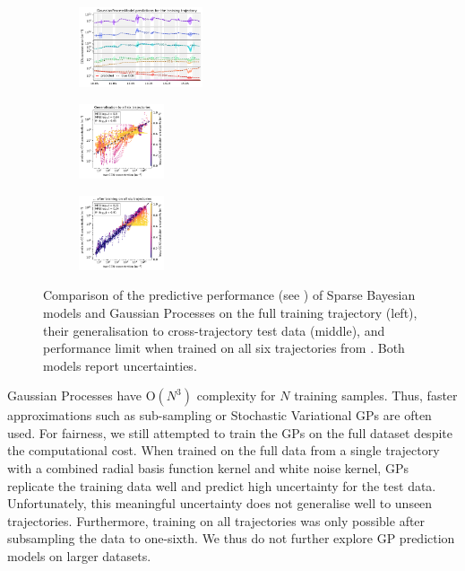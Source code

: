 \begin{figure}[H]
    \begin{subfigure}
    \centering
    \includegraphics[width=0.4\textwidth]{prediction/figures/models/gaussianprocessmodel-training-prediction.pdf}
    \end{subfigure}
    \begin{subfigure}
    \centering
    \includegraphics[width=0.275\textwidth]{prediction/figures/models/gaussianprocessmodel-test-generalisation.pdf}
    \end{subfigure}
    \begin{subfigure}
    \centering
    \includegraphics[width=0.275\textwidth]{prediction/figures/models/gaussianprocessmodel-test-prediction.pdf}
    \end{subfigure}
   
    \vspace{-1em}
    \caption[Predictive Performance of Sparse Bayesian models and Gaussian Processes]{Comparison of the predictive performance (see ) of Sparse Bayesian models and Gaussian Processes on the full training trajectory (left), their generalisation to cross-trajectory test data (middle), and performance limit when trained on all six trajectories from . Both models report uncertainties.}
    \label{fig:bayesian-gp-models}
\end{figure}

\noindent Gaussian Processes have $\text{O}(N^3)$ complexity for $N$ training samples. Thus, faster approximations such as sub-sampling or Stochastic Variational GPs \cite{svgp-2013} are often used. For fairness, we still attempted to train the GPs on the full dataset despite the computational cost. When trained on the full data from a single trajectory with a combined radial basis function kernel and white noise kernel, GPs replicate the training data well and predict high uncertainty for the test data. Unfortunately, this meaningful uncertainty does not generalise well to unseen trajectories. Furthermore, training on all trajectories was only possible after subsampling the data to one-sixth. We thus do not further explore GP prediction models on larger datasets.

